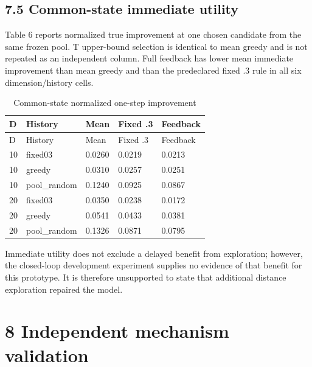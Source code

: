 \documentclass[11pt,a4paper]{article}
\begin{document}
\hypertarget{common-state-immediate-utility}{%
\subsection{7.5 Common-state immediate
utility}\label{common-state-immediate-utility}}

Table 6 reports normalized true improvement at one chosen candidate from
the same frozen pool. T upper-bound selection is identical to mean
greedy and is not repeated as an independent column. Full feedback has
lower mean immediate improvement than mean greedy and than the
predeclared fixed .3 rule in all six dimension/history cells.

\par\noindent\begin{minipage}{\linewidth}

\begin{longtable}[]{@{}lllll@{}}
\caption{Common-state normalized one-step improvement}\tabularnewline
\toprule
D & History & Mean & Fixed .3 & Feedback \\
\midrule
\endfirsthead
\toprule
D & History & Mean & Fixed .3 & Feedback \\
\midrule
\endhead
10 & fixed03 & 0.0260 & 0.0219 & 0.0213 \\
10 & greedy & 0.0310 & 0.0257 & 0.0251 \\
10 & pool\_random & 0.1240 & 0.0925 & 0.0867 \\
20 & fixed03 & 0.0350 & 0.0238 & 0.0172 \\
20 & greedy & 0.0541 & 0.0433 & 0.0381 \\
20 & pool\_random & 0.1326 & 0.0871 & 0.0795 \\
\bottomrule
\end{longtable}

\end{minipage}\par

Immediate utility does not exclude a delayed benefit from exploration;
however, the closed-loop development experiment supplies no evidence of
that benefit for this prototype. It is therefore unsupported to state
that additional distance exploration repaired the model.

\hypertarget{independent-mechanism-validation}{%
\section{8 Independent mechanism
validation}\label{independent-mechanism-validation}}
\end{document}
